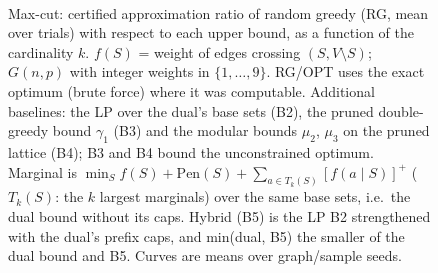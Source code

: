\begin{figure}[t]
\centering
\setlength{\rgplotwidth}{0.49\columnwidth}
\\[1pt]

\caption{Max-cut: certified approximation ratio of random greedy (RG, mean over trials) with respect to each upper bound, as a function of the cardinality $k$. $f(S)$ = weight of edges crossing $(S, V\setminus S)$; $G(n,p)$ with integer weights in $\{1,\dots,9\}$. RG/OPT uses the exact optimum (brute force) where it was computable. Additional baselines: the LP over the dual's base sets (B2), the pruned double-greedy bound $\gamma_1$ (B3) and the modular bounds $\mu_2$, $\mu_3$ on the pruned lattice (B4); B3 and B4 bound the unconstrained optimum. Marginal is $\min_S f(S)+\mathrm{Pen}(S)+\sum_{a\in T_k(S)}[f(a\mid S)]^+$ ($T_k(S)$: the $k$ largest marginals) over the same base sets, i.e.\ the dual bound without its caps. Hybrid (B5) is the LP B2 strengthened with the dual's prefix caps, and min(dual, B5) the smaller of the dual bound and B5. Curves are means over graph/sample seeds.}
\label{fig:rg-max_cut-hybrid}
\end{figure}
